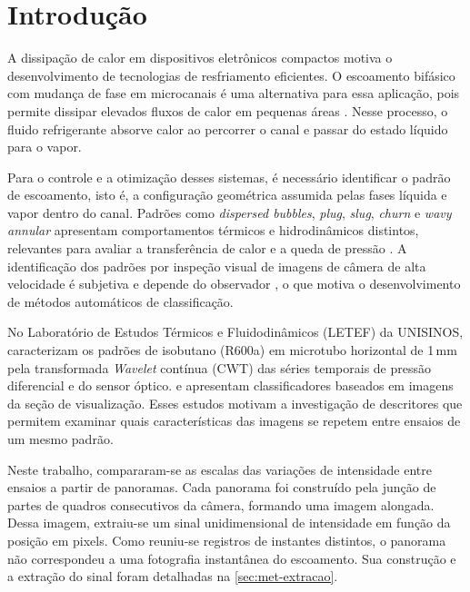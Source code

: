 \chapter{Introdução}\label{cap:introducao}

A dissipação de calor em dispositivos eletrônicos compactos motiva o
desenvolvimento de tecnologias de resfriamento eficientes. O escoamento
bifásico com mudança de fase em microcanais é uma alternativa para essa
aplicação, pois permite dissipar elevados fluxos de calor em pequenas
áreas \cite{cheng2023}. Nesse processo, o fluido refrigerante absorve calor
ao percorrer o canal e passar do estado líquido para o vapor.

Para o controle e a otimização desses sistemas, é necessário identificar o padrão de
escoamento, isto é, a configuração geométrica assumida pelas fases líquida e vapor dentro
do canal. Padrões como \textit{dispersed bubbles}, \textit{plug}, \textit{slug}, \textit{churn} e
\textit{wavy annular} apresentam comportamentos térmicos e hidrodinâmicos distintos, relevantes
para avaliar a transferência de calor e a queda de pressão \cite{cheng2023,deoliveira2021}. A identificação dos padrões por
inspeção visual de imagens de câmera de alta velocidade é subjetiva e depende
do observador \cite{dias2025knn}, o que motiva o desenvolvimento de métodos
automáticos de classificação.

No Laboratório de Estudos Térmicos e Fluidodinâmicos (LETEF) da UNISINOS,
 caracterizam os padrões de isobutano (R600a) em microtubo
horizontal de 1\,mm pela transformada \textit{Wavelet} contínua (CWT) das séries
temporais de pressão diferencial e do sensor óptico.  e
 apresentam classificadores baseados em imagens da seção
de visualização. Esses estudos motivam a investigação de descritores que permitem examinar quais
características das imagens se repetem entre ensaios de um mesmo padrão.

Neste trabalho, compararam-se as escalas das variações de intensidade entre
ensaios a partir de panoramas. Cada panorama foi construído pela junção de
partes de quadros consecutivos da câmera, formando uma imagem alongada.
Dessa imagem, extraiu-se um sinal unidimensional de intensidade em função da
posição em pixels. Como reuniu-se registros de instantes distintos, o panorama
não correspondeu a uma fotografia instantânea do escoamento. Sua construção
e a extração do sinal foram detalhadas na \autoref{sec:met-extracao}.

